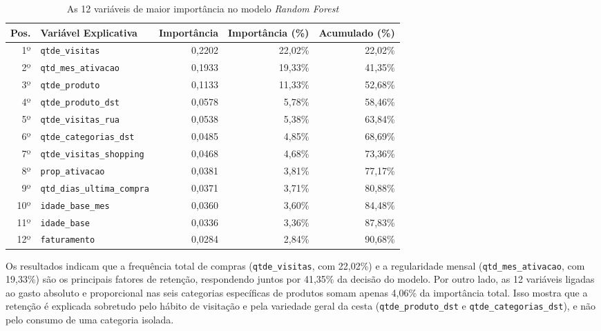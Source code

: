 \begin{table}[H]
\centering
\caption{As 12 variáveis de maior importância no modelo \textit{Random Forest}}
\label{tab:feature_importance}
\begin{tabular}{rlrrr}
\toprule
\textbf{Pos.} & \textbf{Variável Explicativa} & \textbf{Importância} & \textbf{Importância (\%)} & \textbf{Acumulado (\%)} \\
\midrule
1º  & \texttt{qtde\_visitas}            & 0,2202 & 22,02\% & 22,02\% \\
2º  & \texttt{qtd\_mes\_ativacao}       & 0,1933 & 19,33\% & 41,35\% \\
3º  & \texttt{qtde\_produto}            & 0,1133 & 11,33\% & 52,68\% \\
4º  & \texttt{qtde\_produto\_dst}       & 0,0578 &  5,78\% & 58,46\% \\
5º  & \texttt{qtde\_visitas\_rua}       & 0,0538 &  5,38\% & 63,84\% \\
6º  & \texttt{qtde\_categorias\_dst}    & 0,0485 &  4,85\% & 68,69\% \\
7º  & \texttt{qtde\_visitas\_shopping}  & 0,0468 &  4,68\% & 73,36\% \\
8º  & \texttt{prop\_ativacao}           & 0,0381 &  3,81\% & 77,17\% \\
9º  & \texttt{qtd\_dias\_ultima\_compra}& 0,0371 &  3,71\% & 80,88\% \\
10º & \texttt{idade\_base\_mes}         & 0,0360 &  3,60\% & 84,48\% \\
11º & \texttt{idade\_base}              & 0,0336 &  3,36\% & 87,83\% \\
12º & \texttt{faturamento}              & 0,0284 &  2,84\% & 90,68\% \\
\bottomrule
\end{tabular}
\end{table}

Os resultados indicam que a frequência total de compras (\texttt{qtde\_visitas}, com 22,02\%) e a regularidade mensal (\texttt{qtd\_mes\_ativacao}, com 19,33\%) são os principais fatores de retenção, respondendo juntos por 41,35\% da decisão do modelo. Por outro lado, as 12 variáveis ligadas ao gasto absoluto e proporcional nas seis categorias específicas de produtos somam apenas 4,06\% da importância total. Isso mostra que a retenção é explicada sobretudo pelo hábito de visitação e pela variedade geral da cesta (\texttt{qtde\_produto\_dst} e \texttt{qtde\_categorias\_dst}), e não pelo consumo de uma categoria isolada.

